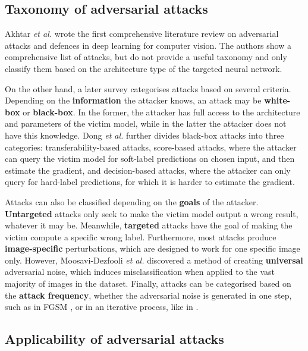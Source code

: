 \subsection{Taxonomy of adversarial attacks}

Akhtar \textit{et al.} \cite{akhtar} wrote the first comprehensive literature review on adversarial attacks and defences in deep learning for computer vision. The authors show a comprehensive list of attacks, but do not provide a useful taxonomy and only classify them based on the architecture type of the targeted neural network. 

On the other hand, a later survey \cite{silva_survey} categorises attacks based on several criteria. Depending on the \textbf{information} the attacker knows, an attack may be \textbf{white-box} or \textbf{black-box}. In the former, the attacker has full access to the architecture and parameters of the victim model, while in the latter the attacker does not have this knowledge. Dong \textit{et al.} \cite{dong2020benchmarking} further divides black-box attacks into three categories: transferability-based attacks, score-based attacks, where the attacker can query the victim model for soft-label predictions on chosen input, and then estimate the gradient, and decision-based attacks, where the attacker can only query for hard-label predictions, for which it is harder to estimate the gradient.

Attacks can also be classified depending on the \textbf{goals} of the attacker. \textbf{Untargeted} attacks only seek to make the victim model output a wrong result, whatever it may be. Meanwhile, \textbf{targeted} attacks have the goal of making the victim compute a specific wrong label. Furthermore, most attacks produce \textbf{image-specific} perturbations, which are designed to work for one specific image only. However, Moosavi-Dezfooli \textit{et al.} \cite{Moosavi-Dezfooli_2017_CVPR} discovered a method of creating \textbf{universal} adversarial noise, which induces misclassification when applied to the vast majority of images in the dataset. Finally, attacks can be categorised based on the \textbf{attack frequency}, whether the adversarial noise is generated in one step, such as in FGSM \cite{fgsm}, or in an iterative process, like in \cite{carlini2017towards}.

\subsection{Applicability of adversarial attacks}
  
